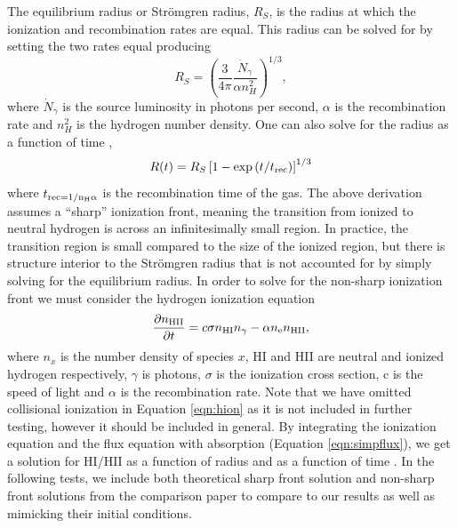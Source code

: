 \documentclass[fleq,usenatbib]{mnras}
\newcommand{\strom}{Str\"omgren}
\begin{document}
The equilibrium radius or \strom{} radius, $R_S$, is the radius at which the 
ionization and recombination rates are equal. This radius can be solved for by 
setting the two rates equal producing \citep[e.g.][]{tielens05}
\begin{equation}
R_S = \left(\frac{3}{4\pi}\frac{\dot{N}_\gamma}{\alpha n^2_{H}}\right)^{1/3},
\end{equation}
where $\dot{N}_\gamma$ is the source luminosity in photons per second, 
$\alpha$ is the recombination rate and $n^2_H$ is the hydrogen number density. 
One can also solve for the radius as a function of time 
\citep[e.g.][]{spitzer78},
\begin{equation}\label{eqn:stromtime}
R(t) = R_S\left[1-\exp\left(t/t_{\rm rec}\right)\right]^{1/3}
\end{equation}
where $t_{\rm rec = 1/{n_H \alpha}}$ is the recombination time of the 
gas. The above derivation assumes a ``sharp'' ionization front, meaning the 
transition from ionized to neutral hydrogen is across an infinitesimally small 
region. In practice, the transition region is small compared to the size of 
the ionized region, but there is structure interior to the \strom{} radius 
that is not accounted for by simply solving for the equilibrium radius. In 
order to solve for the non-sharp ionization front we must consider the 
hydrogen ionization equation
\begin{equation}\label{eqn:hion}
\frac{\partial n_{\rm HII}}{\partial t} = c \sigma n_{\rm HI} n_{\gamma} - 
\alpha n_{\rm e} n_{\rm HII},
\end{equation}
where $n_x$ is the number density of species $x$, HI and HII are neutral 
and ionized hydrogen respectively, $\gamma$ is photons, $\sigma$ is the 
ionization cross section, c is the speed of light and $\alpha$ is the 
recombination rate. Note that we have omitted collisional ionization in 
Equation \ref{eqn:hion} as it is not included in further testing, however it 
should be included in general. By integrating the ionization equation and the 
flux equation with absorption (Equation \ref{eqn:simpflux}), we get a solution 
for HI/HII as a function of radius and as a function of time 
\citep{osterbrockFerland2006}. In the following tests, we include both 
theoretical sharp front solution and non-sharp front solutions from the 
\cite{ilievEt06} comparison paper to compare to our results as well as 
mimicking their initial conditions.
\end{document}
